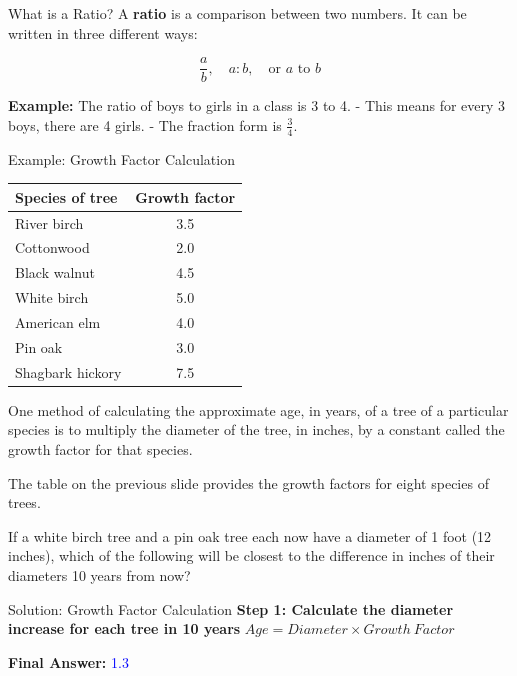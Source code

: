 \documentclass{beamer}
\begin{document}
\begin{frame}{What is a Ratio?}
    A \textbf{ratio} is a comparison between two numbers. It can be written in three different ways:
    
    \[
    \frac{a}{b}, \quad a:b, \quad \text{or } a \text{ to } b
    \]

    \textbf{Example:} The ratio of boys to girls in a class is 3 to 4.  
    - This means for every 3 boys, there are 4 girls.  
    - The fraction form is \( \frac{3}{4} \).
\end{frame}




\begin{frame}{Example: Growth Factor Calculation}

        \begin{tabular}{|l|c|}
            \hline
            \textbf{Species of tree} & \textbf{Growth factor} \\ \hline
            River birch & 3.5 \\ \hline
            Cottonwood & 2.0 \\ \hline
            Black walnut & 4.5 \\ \hline
            White birch & 5.0 \\ \hline
            American elm & 4.0 \\ \hline
            Pin oak & 3.0 \\ \hline
            Shagbark hickory & 7.5 \\ \hline
        \end{tabular}

        One method of calculating the approximate age, in years, of a tree of a particular species is to multiply the diameter of the tree, in inches, by a constant called the growth factor for that species.

        The table on the previous slide provides the growth factors for eight species of trees.

        If a white birch tree and a pin oak tree each now have a diameter of 1 foot (12 inches), which of the following will be closest to the difference in inches of their diameters 10 years from now?  
\end{frame}

\begin{frame}{Solution: Growth Factor Calculation}
    \textbf{Step 1: Calculate the diameter increase for each tree in 10 years}
    $Age = Diameter \times Growth\ Factor $

    

    \textbf{Final Answer:} \textcolor{blue}{ 1.3}
\end{frame}
\end{document}
